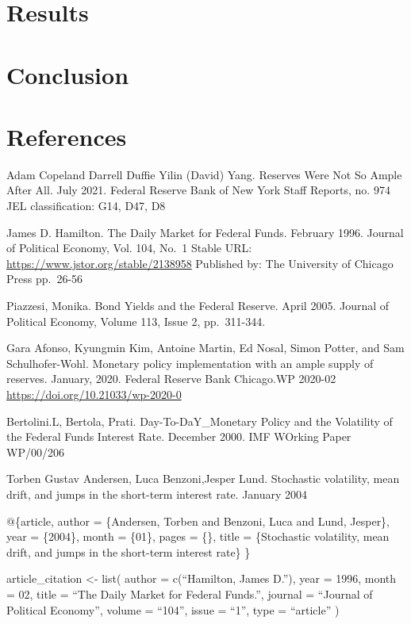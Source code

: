 \documentclass[
]{article}
\begin{document}
\hypertarget{results}{%
\section{Results}\label{results}}

\hypertarget{conclusion}{%
\section{Conclusion}\label{conclusion}}

\hypertarget{references}{%
\section{References}\label{references}}

Adam Copeland \textbar{} Darrell Duffie \textbar{} Yilin (David) Yang. Reserves Were Not So Ample After All. July 2021. Federal Reserve Bank of New York Staff Reports, no. 974
JEL classification: G14, D47, D8

James D. Hamilton. The Daily Market for Federal Funds. February 1996. Journal of Political Economy, Vol. 104, No.~1
Stable URL: \url{https://www.jstor.org/stable/2138958}
Published by: The University of Chicago Press pp.~26-56

Piazzesi, Monika. Bond Yields and the Federal Reserve. April 2005. Journal of Political Economy, Volume 113, Issue 2, pp.~311-344.

Gara Afonso, Kyungmin Kim, Antoine Martin, Ed Nosal, Simon Potter, and Sam Schulhofer-Wohl. Monetary policy implementation with an ample supply of reserves. January, 2020. Federal Reserve Bank Chicago.WP 2020-02
\url{https://doi.org/10.21033/wp-2020-0}

Bertolini.L, Bertola, Prati. Day-To-DaY\_Monetary Policy and the Volatility of the Federal Funds Interest Rate. December 2000. IMF WOrking Paper WP/00/206

Torben Gustav Andersen, Luca Benzoni,Jesper Lund. Stochastic volatility, mean drift, and jumps in the short-term interest rate. January 2004

@\{article,
author = \{Andersen, Torben and Benzoni, Luca and Lund, Jesper\},
year = \{2004\},
month = \{01\},
pages = \{\},
title = \{Stochastic volatility, mean drift, and jumps in the short-term interest rate\}
\}

article\_citation \textless- list(
author = c(``Hamilton, James D.''),
year = 1996,
month = 02,
title = ``The Daily Market for Federal Funds.'',
journal = ``Journal of Political Economy'',
volume = ``104'',
issue = ``1'',
type = ``article''
)
\end{document}
